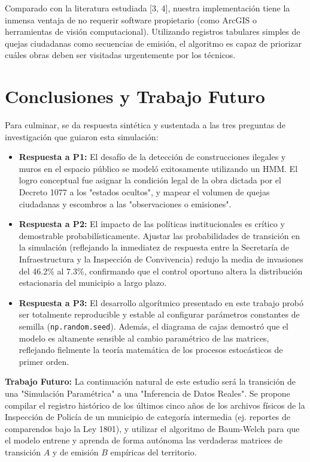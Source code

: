 \documentclass[12pt,letterpaper]{article}
\begin{document}
Comparado con la literatura estudiada [3, 4], nuestra implementación tiene la inmensa ventaja de no requerir software propietario (como ArcGIS o herramientas de visión computacional). Utilizando registros tabulares simples de quejas ciudadanas como secuencias de emisión, el algoritmo es capaz de priorizar cuáles obras deben ser visitadas urgentemente por los técnicos.

\section{Conclusiones y Trabajo Futuro}

Para culminar, se da respuesta sintética y sustentada a las tres preguntas de investigación que guiaron esta simulación:

\begin{itemize}
    \item \textbf{Respuesta a P1:} El desafío de la detección de construcciones ilegales y muros en el espacio público se modeló exitosamente utilizando un HMM. El logro conceptual fue asignar la condición legal de la obra dictada por el Decreto 1077 a los "estados ocultos", y mapear el volumen de quejas ciudadanas y escombros a las "observaciones o emisiones".
    
    \item \textbf{Respuesta a P2:} El impacto de las políticas institucionales es crítico y demostrable probabilísticamente. Ajustar las probabilidades de transición en la simulación (reflejando la inmediatez de respuesta entre la Secretaría de Infraestructura y la Inspección de Convivencia) redujo la media de invasiones del 46.2\% al 7.3\%, confirmando que el control oportuno altera la distribución estacionaria del municipio a largo plazo.
    
    \item \textbf{Respuesta a P3:} El desarrollo algorítmico presentado en este trabajo probó ser totalmente reproducible y estable al configurar parámetros constantes de semilla (\texttt{np.random.seed}). Además, el diagrama de cajas demostró que el modelo es altamente sensible al cambio paramétrico de las matrices, reflejando fielmente la teoría matemática de los procesos estocásticos de primer orden.
\end{itemize}

\textbf{Trabajo Futuro:}
La continuación natural de este estudio será la transición de una "Simulación Paramétrica" a una "Inferencia de Datos Reales". Se propone compilar el registro histórico de los últimos cinco años de los archivos físicos de la Inspección de Policía de un municipio de categoría intermedia (ej. reportes de comparendos bajo la Ley 1801), y utilizar el algoritmo de Baum-Welch para que el modelo entrene y aprenda de forma autónoma las verdaderas matrices de transición $A$ y de emisión $B$ empíricas del territorio.
\end{document}
